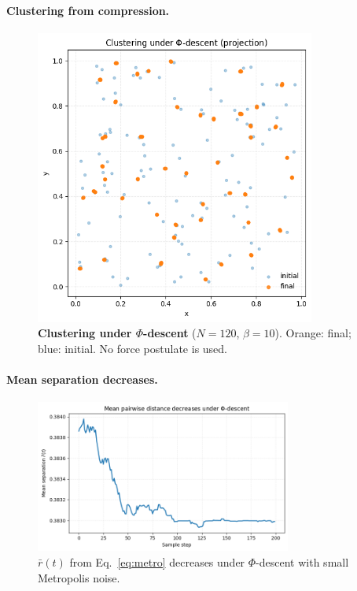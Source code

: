 \documentclass[aps,preprint,onecolumn,longbibliography,nofootinbib]{revtex4-2}
\numberwithin{equation}{section}        %
\begin{document}
\paragraph*{Clustering from compression.}
\begin{figure}[H]
\centering
\includegraphics[width=0.82\textwidth]{figures/clustering.png}
\caption{\textbf{Clustering under $\Phi$-descent} ($N{=}120$, $\beta{=}10$). Orange: final; blue: initial. No force postulate is used.}
\label{fig:clustering}
\end{figure}

\paragraph*{Mean separation decreases.}
\begin{figure}[H]
\centering
\includegraphics[width=0.75\textwidth]{figures/mean_distance.png}
\caption{$\bar r(t)$ from Eq.~\eqref{eq:metro} decreases under $\Phi$-descent with small Metropolis noise.}
\label{fig:mean}
\end{figure}
\end{document}
